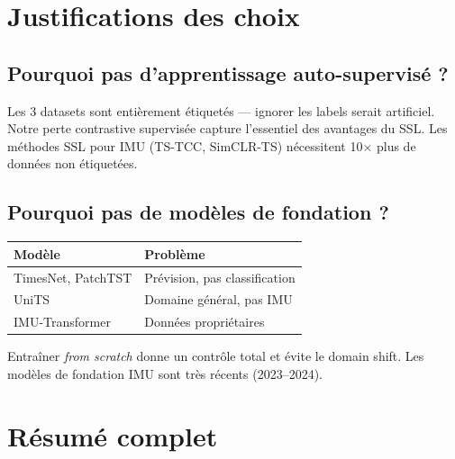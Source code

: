 \documentclass[12pt, a4paper]{article}
\begin{document}
\section{Justifications des choix}

\subsection{Pourquoi pas d'apprentissage auto-supervisé ?}

Les 3 datasets sont entièrement étiquetés --- ignorer les labels serait
artificiel. Notre perte contrastive supervisée capture l'essentiel des
avantages du SSL. Les méthodes SSL pour IMU (TS-TCC, SimCLR-TS) nécessitent
10$\times$ plus de données non étiquetées.

\subsection{Pourquoi pas de modèles de fondation ?}

\begin{table}[h]
\centering
\begin{tabular}{ll}
\toprule
\textbf{Modèle} & \textbf{Problème} \\
\midrule
TimesNet, PatchTST  & Prévision, pas classification \\
UniTS               & Domaine général, pas IMU \\
IMU-Transformer     & Données propriétaires \\
\bottomrule
\end{tabular}
\end{table}

Entraîner \emph{from scratch} donne un contrôle total et évite le domain
shift. Les modèles de fondation IMU sont très récents (2023--2024).

\section{Résumé complet}
\end{document}

